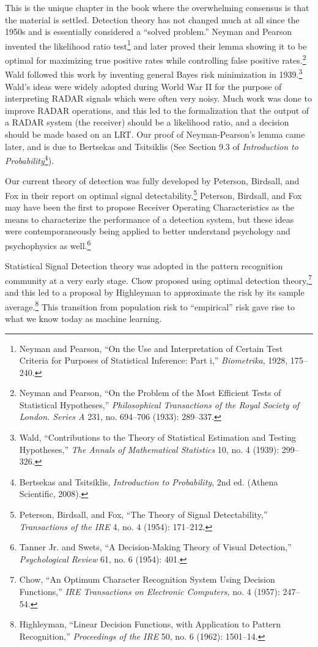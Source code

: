 \documentclass{tufte-book}
\begin{document}
This is the unique chapter in the book where the overwhelming consensus
is that the material is settled. Detection theory has not changed much
at all since the 1950s and is essentially considered a ``solved
problem.'' Neyman and Pearson invented the likelihood ratio
test\footnote{Neyman and Pearson, {``On the Use and Interpretation of
  Certain Test Criteria for Purposes of Statistical Inference: Part
  i,''} \emph{Biometrika}, 1928, 175--240.} and later proved their lemma
showing it to be optimal for maximizing true positive rates while
controlling false positive rates.\footnote{Neyman and Pearson, {``On the
  Problem of the Most Efficient Tests of Statistical Hypotheses,''}
  \emph{Philosophical Transactions of the Royal Society of London.
  Series A} 231, no. 694--706 (1933): 289--337.} Wald followed this work
by inventing general Bayes risk minimization in 1939.\footnote{Wald,
  {``Contributions to the Theory of Statistical Estimation and Testing
  Hypotheses,''} \emph{The Annals of Mathematical Statistics} 10, no. 4
  (1939): 299--326.} Wald's ideas were widely adopted during World War
II for the purpose of interpreting RADAR signals which were often very
noisy. Much work was done to improve RADAR operations, and this led to
the formalization that the output of a RADAR system (the receiver)
should be a likelihood ratio, and a decision should be made based on an
LRT. Our proof of Neyman-Pearson's lemma came later, and is due to
Bertsekas and Tsitsiklis (See Section 9.3 of \emph{Introduction to
Probability}\footnote{Bertsekas and Tsitsiklis, \emph{Introduction to
  Probability}, 2nd ed. (Athena Scientific, 2008).}).

Our current theory of detection was fully developed by Peterson,
Birdsall, and Fox in their report on optimal signal
detectability.\footnote{Peterson, Birdsall, and Fox, {``The Theory of
  Signal Detectability,''} \emph{Transactions of the {IRE}} 4, no. 4
  (1954): 171--212.} Peterson, Birdsall, and Fox may have been the first
to propose Receiver Operating Characteristics as the means to
characterize the performance of a detection system, but these ideas were
contemporaneously being applied to better understand psychology and
psychophysics as well.\footnote{Tanner Jr. and Swets, {``A
  Decision-Making Theory of Visual Detection,''} \emph{Psychological
  Review} 61, no. 6 (1954): 401.}

Statistical Signal Detection theory was adopted in the pattern
recognition community at a very early stage. Chow proposed using optimal
detection theory,\footnote{Chow, {``An Optimum Character Recognition
  System Using Decision Functions,''} \emph{{IRE} Transactions on
  Electronic Computers}, no. 4 (1957): 247--54.} and this led to a
proposal by Highleyman to approximate the risk by its sample
average.\footnote{Highleyman, {``Linear Decision Functions, with
  Application to Pattern Recognition,''} \emph{Proceedings of the {IRE}}
  50, no. 6 (1962): 1501--14.} This transition from population risk to
``empirical'' risk gave rise to what we know today as machine learning.
\end{document}

